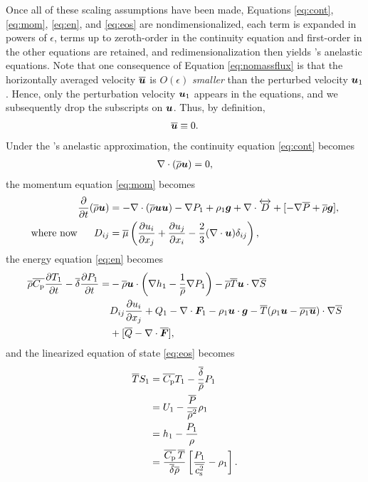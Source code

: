 \documentclass[12pt]{article}
\newcommand{\vecf}{\bm{F}}
\newcommand{\deltaref}{\overline{\delta}}
\newcommand{\cpref}{\overline{\cpcap}}
\newcommand{\cssqref}{\overline{\cs^2}}
\begin{document}
	Once all of these scaling assumptions have been made, Equations \eqref{eq:cont}, \eqref{eq:mom}, \eqref{eq:en}, and \eqref{eq:eos} are nondimensionalized, each term is expanded in powers of $\epsilon$, terms up to zeroth-order in the continuity equation and first-order in the other equations are retained, and redimensionalization then yields \citet{Gough1969}'s anelastic equations. Note that one consequence of Equation \eqref{eq:nomassflux} is that the horizontally averaged velocity $\overline{\bm{u}}$ is $O(\epsilon)$ \textit{smaller} than the perturbed velocity $\bm{u}_1$. Hence, only the perturbation velocity $\bm{u}_1$ appears in the equations, and we subsequently drop the subscripts on $\bm{u}$. Thus, by definition, 
	\begin{align}\label{eq:nomeanu}
		\overline{\bm{u}}\equiv0.
	\end{align}
	Under the \citet{Gough1969}'s anelastic approximation, the continuity equation \eqref{eq:cont} becomes
	\begin{align}\label{eq:ancont}
		\nabla\cdot(\overline{\rho}\bm{u})= 0,
	\end{align}
	the momentum equation \eqref{eq:mom} becomes 
	\begin{subequations}\label{eq:anmom}
	\begin{align}
		\frac{\partial}{\partial t}(\overline{\rho}\bm{u})&=-\nabla\cdot(\overline{\rho}\bm{u}\bm{u}) - \nabla P_1 +\rho_1\bm{g} +\nabla\cdot \overleftrightarrow{D}+[-\nabla\overline{P} + \overline{\rho}\bm{g}],\label{eq:anmommain}\\
		\text{where now}\ \ \ \ \  D_{ij}& = \overline{\mu}\left(\frac{\partial u_i}{\partial x_j} + \frac{\partial u_j}{\partial x_i} - \frac{2}{3}(\nabla\cdot\bm{u})\delta_{ij}\right)\label{eq:anmomvisc},
	\end{align}
	\end{subequations}
	the energy equation \eqref{eq:en} becomes 
	\begin{align}\label{eq:anen}
		\rhoref\cpref\pderiv{T_1}{t} - \deltaref\pderiv{P_1}{t} = &-\rhoref\vecu\cdot\left(\nabla h_1-\frac{1}{\rhoref}\nabla P_1\right) - \rhoref \tmpref \ugrad \sref\nonumber\\
		& D_{ij}\pderiv{u_i}{x_j} + Q _1- \Div\vecf_1 -\rho_1\vecu\cdot\vecg - \tmpref(\rho_1\vecu-\overline{\rho_1\vecu})\cdot\nabla\sref\nonumber\\
		&+ [\qref - \Div\overline{\vecf}],
	\end{align}
  and the linearized equation of state \eqref{eq:eos} becomes
  \begin{subequations}\label{eq:aneos}
  \begin{align}
  	\tmpref S_1 &= \cpref T_1 - \frac{\deltaref}{\rhoref} P_1\label{eq:lintp}\\
  	&= U_1 - \frac{\prsref}{\rhoref^2}\rho_1 \label{eq:linu}\\
  	&= h_1 - \frac{P_1}{\rho}\\
  	&= \frac{\cpref\, \tmpref}{\deltaref\rhoref}\left[\frac{P_1}{\cssqref}-\rho_1\right].
  \end{align}
  \end{subequations}
\end{document}
